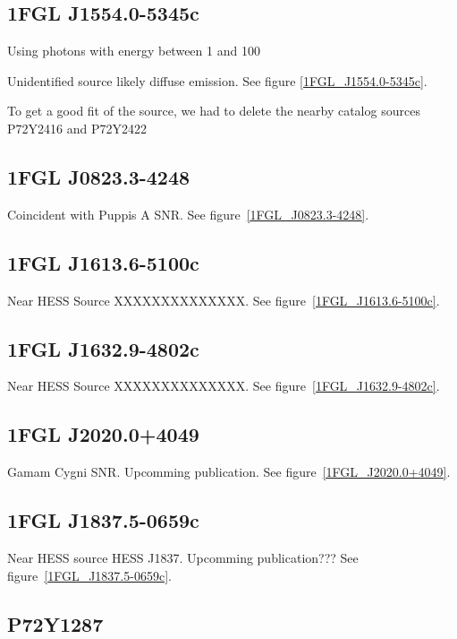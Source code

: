 \documentclass[preprint]{aastex}
\newcommand{\gev}{\text{GeV}\xspace}
\begin{document}
\subsection{1FGL J1554.0-5345c}

Using photons with energy between 1 \gev and 100 \gev

Unidentified source likely diffuse emission.
See figure \ref{1FGL_J1554.0-5345c}.

To get a good fit of the source, we had to delete the nearby catalog sources P72Y2416 and P72Y2422


\subsection{1FGL J0823.3-4248}
Coincident with Puppis A SNR.
See figure~\ref{1FGL_J0823.3-4248}.

\subsection{1FGL J1613.6-5100c}
Near HESS Source XXXXXXXXXXXXXX.
See figure~\ref{1FGL_J1613.6-5100c}.

\subsection{1FGL J1632.9-4802c}
Near HESS Source XXXXXXXXXXXXXX.
See figure~\ref{1FGL_J1632.9-4802c}.


\subsection{1FGL J2020.0+4049}
Gamam Cygni SNR. Upcomming publication. 
See figure~\ref{1FGL_J2020.0+4049}.

\subsection{1FGL J1837.5-0659c}
Near HESS source HESS J1837. Upcomming publication???
See figure~\ref{1FGL_J1837.5-0659c}.

\subsection{P72Y1287}
\end{document}
